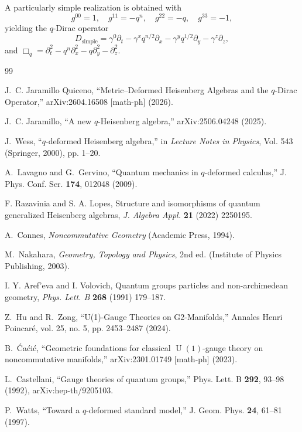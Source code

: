 \documentclass[12pt,a4paper]{article}
\theoremstyle{plain}
\theoremstyle{definition}
\begin{document}
A particularly simple realization is obtained with
\[
g^{00}=1,\quad g^{11}=-q^{n},\quad g^{22}=-q,\quad g^{33}=-1,
\]
yielding the $q$-Dirac operator
\[
D_{\text{simple}} = \gamma^{0}\partial_t - \gamma^{x} q^{n/2}\partial_x - \gamma^{y} q^{1/2}\partial_y - \gamma^{z}\partial_z,
\]
and $\Box_q = \partial_t^2 - q^{n}\partial_x^2 - q\partial_y^2 - \partial_z^2$.

\begin{thebibliography}{99}

J.~C. Jaramillo Quiceno, ``Metric–Deformed Heisenberg Algebras and the $q$-Dirac Operator,'' arXiv:2604.16508 [math-ph] (2026).

J.~C. Jaramillo, ``A new $q$-Heisenberg algebra,'' arXiv:2506.04248 (2025).

J.~Wess, ``$q$-deformed Heisenberg algebra,'' in \emph{Lecture Notes in Physics}, Vol. 543 (Springer, 2000), pp. 1--20.

A.~Lavagno and G.~Gervino, ``Quantum mechanics in $q$-deformed calculus,'' J. Phys. Conf. Ser. \textbf{174}, 012048 (2009).

F. Razavinia and S. A. Lopes, Structure and isomorphisms of quantum generalized Heisenberg algebras, {\it J. Algebra Appl.} {\bf 21} (2022) 2250195.

A.~Connes, \emph{Noncommutative Geometry} (Academic Press, 1994).

M.~Nakahara, \emph{Geometry, Topology and Physics}, 2nd ed. (Institute of Physics Publishing, 2003).

I. Y. Aref'eva and I. Volovich, Quantum groups particles and non-archimedean geometry, {\it Phys. Lett. B} {\bf 268} (1991) 179--187.

Z.~Hu and R.~Zong, ``U(1)-Gauge Theories on G2-Manifolds,'' Annales Henri Poincaré, vol. 25, no. 5, pp. 2453–2487 (2024).

B.~Ćaćić, ``Geometric foundations for classical $\operatorname{U}(1)$-gauge theory on noncommutative manifolds,'' arXiv:2301.01749 [math-ph] (2023).

L.~Castellani, ``Gauge theories of quantum groups,'' Phys. Lett. B \textbf{292}, 93--98 (1992), arXiv:hep-th/9205103.

P.~Watts, ``Toward a $q$-deformed standard model,'' J. Geom. Phys. \textbf{24}, 61--81 (1997).


\end{thebibliography}
\end{document}

